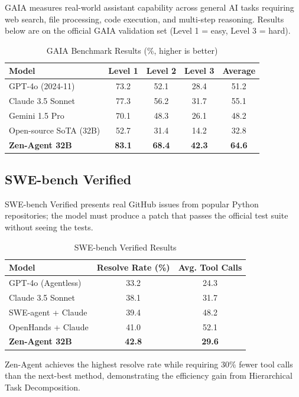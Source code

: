 \documentclass[11pt,a4paper]{article}
\begin{document}
GAIA measures real-world assistant capability across general AI tasks requiring web search,
file processing, code execution, and multi-step reasoning. Results below are on the official
GAIA validation set (Level 1 = easy, Level 3 = hard).

\begin{table}[H]
\centering
\begin{tabular}{lcccc}
\toprule
\textbf{Model} & \textbf{Level 1} & \textbf{Level 2} & \textbf{Level 3} & \textbf{Average} \\
\midrule
GPT-4o (2024-11) & 73.2 & 52.1 & 28.4 & 51.2 \\
Claude 3.5 Sonnet & 77.3 & 56.2 & 31.7 & 55.1 \\
Gemini 1.5 Pro & 70.1 & 48.3 & 26.1 & 48.2 \\
Open-source SoTA (32B) & 52.7 & 31.4 & 14.2 & 32.8 \\
\textbf{Zen-Agent 32B} & \textbf{83.1} & \textbf{68.4} & \textbf{42.3} & \textbf{64.6} \\
\bottomrule
\end{tabular}
\caption{GAIA Benchmark Results (\%, higher is better)}
\end{table}

\subsection{SWE-bench Verified}

SWE-bench Verified presents real GitHub issues from popular Python repositories; the model must
produce a patch that passes the official test suite without seeing the tests.

\begin{table}[H]
\centering
\begin{tabular}{lcc}
\toprule
\textbf{Model} & \textbf{Resolve Rate (\%)} & \textbf{Avg. Tool Calls} \\
\midrule
GPT-4o (Agentless) & 33.2 & 24.3 \\
Claude 3.5 Sonnet & 38.1 & 31.7 \\
SWE-agent + Claude & 39.4 & 48.2 \\
OpenHands + Claude & 41.0 & 52.1 \\
\textbf{Zen-Agent 32B} & \textbf{42.8} & \textbf{29.6} \\
\bottomrule
\end{tabular}
\caption{SWE-bench Verified Results}
\end{table}

Zen-Agent achieves the highest resolve rate while requiring 30\% fewer tool calls than the
next-best method, demonstrating the efficiency gain from Hierarchical Task Decomposition.
\end{document}
